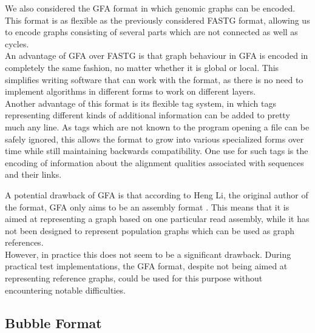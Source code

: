 \documentclass[a4paper,12pt,twoside,BCOR=10mm]{scrbook}
\begin{document}
We also considered the GFA format in which genomic graphs can be encoded.
This format is as flexible as the previously considered FASTG format, allowing us to encode graphs consisting of
several parts which are not connected as well as cycles. \\
An advantage of GFA over FASTG is that
graph behaviour in GFA is encoded in completely the same fashion, no matter whether it is global
or local. This simplifies writing software that can work with the format,
as there is no need to implement algorithms in different forms to work on
different layers. \\
Another advantage of this format is its flexible tag system, in which tags representing different kinds of
additional information can be added to pretty much any line. As tags which are not known to the program
opening a file can be safely ignored, this allows the format to grow into various specialized forms over
time while still maintaining backwards compatibility.
One use for such tags is the encoding of information about the alignment qualities associated with sequences and their links.

A potential drawback of GFA is that
according to Heng Li, the original author of the format, GFA only aims to be an assembly format \citep{specGFA3}.
This means that it is aimed at representing a graph based on one particular read assembly,
while it has not been designed to represent population graphs which can be used as graph references. \\
However, in practice this does not seem to be a significant drawback.
During practical test implementations, the GFA format, despite not being aimed at representing reference graphs,
could be used for this purpose without encountering notable difficulties.

\subsection{Bubble Format}
\end{document}
